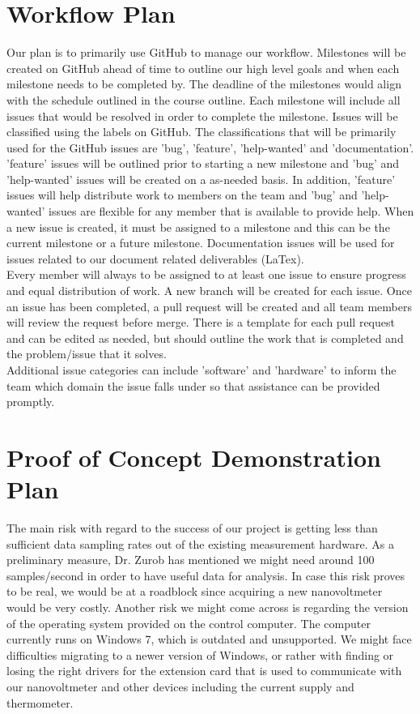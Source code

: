 \documentclass{article}
\begin{document}
\section{Workflow Plan}

\noindent Our plan is to primarily use GitHub to manage our workflow. 
Milestones will be created on GitHub ahead of time to outline our high level goals and when each milestone needs to be completed by.
The deadline of the milestones would align with the schedule outlined in the course outline.
Each milestone will include all issues that would be resolved in order to complete the milestone. 
Issues will be classified using the labels on GitHub. The classifications that will be primarily used for the 
GitHub issues are 'bug', 'feature', 'help-wanted' and 'documentation'. 'feature' issues will be outlined prior to starting a 
new milestone and 'bug' and 'help-wanted' issues will be created on a as-needed basis. In addition, 'feature' issues will help distribute work to 
members on the team and 'bug' and 'help-wanted' issues are flexible for any member that is available to provide help. 
When a new issue is created, it must be assigned to a milestone and this can be the current milestone or a future milestone.
Documentation issues will be used for issues related to our document related deliverables (LaTex). \\

\noindent Every member will always to be assigned to at least one issue to ensure progress and equal distribution of work.
A new branch will be created for each issue. Once an issue has been completed, 
a pull request will be created and all team members will review the request before merge. 
There is a template for each pull request and can be edited as needed, but should outline the work that is completed
and the problem/issue that it solves. \\

\noindent Additional issue categories can include 'software' and 'hardware' to inform the team which domain the issue falls under so 
that assistance can be provided promptly.

\section{Proof of Concept Demonstration Plan}


\noindent The main risk with regard to the success of our project is getting less than sufficient data sampling rates out of the existing measurement hardware. As a preliminary measure, Dr. Zurob has mentioned we might need around 100 samples/second in order to have useful data for analysis. In case this risk proves to be real, we would be at a roadblock since acquiring a new nanovoltmeter would be very costly.
\noindent Another risk we might come across is regarding the version of the operating system provided on the control computer. The computer currently runs on Windows 7, which is outdated and unsupported. We might face difficulties migrating to a newer version of Windows, or rather with finding or losing the right drivers for the extension card that is used to communicate with our nanovoltmeter and other devices including the current supply and thermometer. \\
\end{document}
